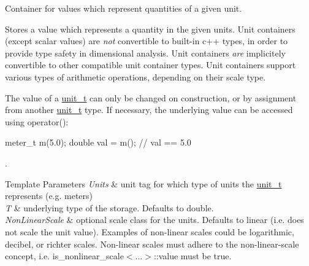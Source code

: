 Container for values which represent quantities of a given unit. 

Stores a value which represents a quantity in the given units. Unit containers (except scalar values) are {\itshape not} convertible to built-\/in c++ types, in order to provide type safety in dimensional analysis. Unit containers {\itshape are} implicitely convertible to other compatible unit container types. Unit containers support various types of arithmetic operations, depending on their scale type.

The value of a {\ttfamily \hyperlink{classunits_1_1unit__t}{unit\+\_\+t}} can only be changed on construction, or by assignment from another {\ttfamily \hyperlink{classunits_1_1unit__t}{unit\+\_\+t}} type. If necessary, the underlying value can be accessed using {\ttfamily operator()}\+:
\begin{DoxyCode}
meter\_t m(5.0);
\textcolor{keywordtype}{double} val = m(); \textcolor{comment}{// val == 5.0 }
\end{DoxyCode}
. 
\begin{DoxyTemplParams}{Template Parameters}
{\em Units} & unit tag for which type of units the {\ttfamily \hyperlink{classunits_1_1unit__t}{unit\+\_\+t}} represents (e.\+g. meters) \\
\hline
{\em T} & underlying type of the storage. Defaults to double. \\
\hline
{\em Non\+Linear\+Scale} & optional scale class for the units. Defaults to linear (i.\+e. does not scale the unit value). Examples of non-\/linear scales could be logarithmic, decibel, or richter scales. Non-\/linear scales must adhere to the non-\/linear-\/scale concept, i.\+e. {\ttfamily is\+\_\+nonlinear\+\_\+scale$<$...$>$\+::value} must be {\ttfamily true}. \\
\hline
\end{DoxyTemplParams}
